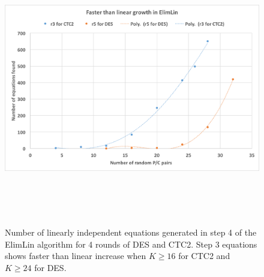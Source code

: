 \begin{figure}[!h]
	\vspace{-0.2cm}
	\centering
	\includegraphics*[width=140mm,height=12cm]{./pics/Test642.png}
	\caption[Number of linearly independent equations generated at step 3 for DES and CTC2]{Number of linearly independent equations generated in step 4
		of the ElimLin algorithm
		for 4 rounds of DES and CTC2. Step 3 equations shows faster than linear increase when $K \geq 16$ for CTC2 and $K \geq 24$ for DES. }
	\label{fig:ElimLinEquationCTCDES}
	\vspace{-0.1cm}
\end{figure}
